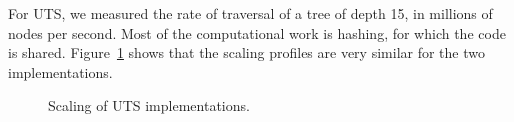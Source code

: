 For UTS, we measured the rate of traversal of a tree of depth 15, in millions
of nodes per second. Most of the computational work is hashing, for which the
code is shared. Figure~\ref{fig:uts-scaling} shows that the scaling profiles
are very similar for the two implementations. 

\begin{figure}
\vspace{-0.3cm}
\hspace{-0.2cm}
\begingroup\graphicspath{{figures/}}\endgroup
\vspace{-0.2cm}
\caption{Scaling of UTS implementations.}
\label{fig:uts-scaling}
\end{figure}



